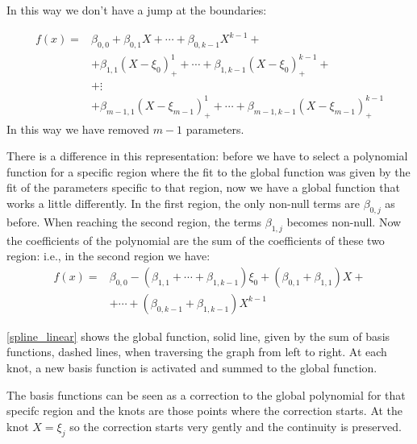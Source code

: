 \documentclass[12pt, letterpaper]{article}
\theoremstyle{definition}
\begin{document}
 In this way we don't have a jump at the boundaries:

\begin{equation}
\begin{aligned}
f(x) =& \beta_{0,0} + \beta_{0,1}X +\cdots+\beta_{0,k-1}  X^{k-1} + \\
&+ \beta_{1,1}(X -\xi_0)_+^1       +\cdots +\beta_{1,k-1} (X -\xi_0)_+^{k-1}+  \\
&+\vdots \\ 
&+ \beta_{m-1,1}(X -\xi_{m-1})_+^1 +\cdots +\beta_{m-1,k-1} (X -\xi_{m-1})_+^{k-1}
\end{aligned}
\end{equation}
In this way we have removed $m-1$ parameters.

There is a difference in this representation: before we have to select a polynomial function for a specific region where the fit to the global function was given by the fit of the parameters specific to that region, now we have a global function that works a little differently. In the first region, the only non-null terms are $\beta_{0,j}$ as before. When reaching the second region, the terms $\beta_{1,j}$ becomes non-null. Now the coefficients of the polynomial are the sum of the coefficients of these two region: i.e., in the second region we have:
\begin{equation}
\begin{aligned}
f(x) =& \beta_{0,0} -(\beta_{1,1}+\cdots+\beta_{1,k-1})\xi_0+ (\beta_{0,1}+\beta_{1,1})X+\\
&+\cdots+(\beta_{0,k-1}  +\beta_{1,k-1})X^{k-1}
\end{aligned}
\end{equation}

\ref{spline_linear} shows the global function, solid line, given by the sum of basis functions, dashed lines, when traversing the graph from left to right. At each knot, a new basis function is activated and summed to the global function.

The basis functions can be seen as a correction to the global polynomial for that  specifc region and the knots are those points where the correction starts. At the knot $X=\xi_j$ so the correction starts very gently and the continuity is preserved.
\end{document}
